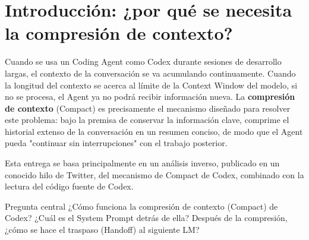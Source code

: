 \section{Introducción: ¿por qué se necesita la compresión de contexto?}

Cuando se usa un Coding Agent como Codex durante sesiones de desarrollo largas, el contexto de la conversación se va acumulando continuamente. Cuando la longitud del contexto se acerca al límite de la Context Window del modelo, si no se procesa, el Agent ya no podrá recibir información nueva. La \textbf{compresión de contexto} (Compact) es precisamente el mecanismo diseñado para resolver este problema: bajo la premisa de conservar la información clave, comprime el historial extenso de la conversación en un resumen conciso, de modo que el Agent pueda "continuar sin interrupciones" con el trabajo posterior.

Esta entrega se basa principalmente en un análisis inverso, publicado en un conocido hilo de Twitter, del mecanismo de Compact de Codex, combinado con la lectura del código fuente de Codex.

\begin{knowledgebox}{Pregunta central}
¿Cómo funciona la compresión de contexto (Compact) de Codex? ¿Cuál es el System Prompt detrás de ella? Después de la compresión, ¿cómo se hace el traspaso (Handoff) al siguiente LM?
\end{knowledgebox}

